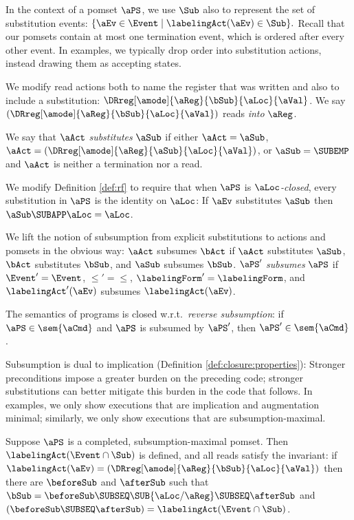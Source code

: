 In the context of a
pomset $\aPS$, we use $\Sub$ also to represent the set of substitution
events:
\begin{math}
  \{ \aEv\in\Event \mid \labelingAct(\aEv) \in \Sub \}.
\end{math}
Recall that our pomsets contain at most one termination event, which is ordered
after every other event.  
In examples, we typically drop order into
substitution actions, instead drawing them as accepting states.

We modify read actions both to name the register that was written
and also to include a substitution:
$\DRreg[\amode]{\aReg}{\bSub}{\aLoc}{\aVal}$.
We say $(\DRreg[\amode]{\aReg}{\bSub}{\aLoc}{\aVal})$ reads \emph{into}
$\aReg$.

We say that $\aAct$ \emph{substitutes} $\aSub$ if either
$\aAct=\aSub$, $\aAct=(\DRreg[\amode]{\aReg}{\aSub}{\aLoc}{\aVal})$, or
$\aSub=\SUBEMP$ and $\aAct$ is neither a termination nor a read.

We modify Definition \ref{def:rf} to require that when $\aPS$ is
\emph{$\aLoc$-closed}, every substitution in $\aPS$ is the identity on
$\aLoc$: If $\aEv$ substitutes $\aSub$ then $\aSub\SUBAPP\aLoc=\aLoc$.

We lift the notion of subsumption from explicit substitutions to actions and
pomsets in the obvious way: $\aAct$ subsumes $\bAct$ if 
$\aAct$ substitutes $\aSub$,
$\bAct$ substitutes $\bSub$, and $\aSub$ subsumes
$\bSub$.
$\aPS'$ \emph{subsumes} $\aPS$ if $\Event'=\Event$, ${\le'}={\le}$,
$\labelingForm'=\labelingForm$, and $\labelingAct'(\aEv)$
subsumes $\labelingAct(\aEv)$. 

The semantics of programs is closed w.r.t.~\emph{reverse subsumption}: if
$\aPS\in\sem{\aCmd}$ and $\aPS$ is subsumed by $\aPS'$, then
$\aPS'\in\sem{\aCmd}$.

Subsumption is dual to implication (Definition \ref{def:closure:properties}):
Strong\-er preconditions impose a greater burden on the preceding code;
stronger substitutions can better mitigate this burden in the code that
follows.  In examples, we only show executions that are implication and
augmentation minimal; similarly, we only show executions that are
subsumption-maximal.

Suppose $\aPS$ is a completed, subsumption-maximal pomset.  Then
$\labelingAct(\Event\cap\Sub)$ is defined, and all reads satisfy the invariant:
if $\labelingAct(\aEv)=(\DRreg[\amode]{\aReg}{\bSub}{\aLoc}{\aVal})$ then there are
$\beforeSub$ and $\afterSub$ such that
$\bSub=\beforeSub\SUBSEQ\SUB{\aLoc/\aReg}\SUBSEQ\afterSub$ and
$(\beforeSub\SUBSEQ\afterSub) = \labelingAct(\Event\cap\Sub)$.



